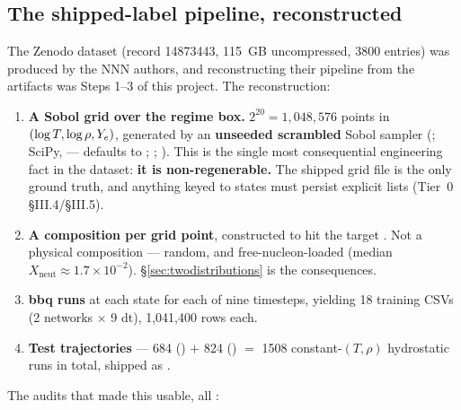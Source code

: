 \subsection{The shipped-label pipeline, reconstructed}
\label{sec:shippedpipeline}

The Zenodo dataset (record 14873443, 115~GB uncompressed, 3800 entries) was
produced by the NNN authors, and reconstructing their pipeline from the
artifacts was Steps 1--3 of this project. The reconstruction:

\begin{enumerate}
\item \textbf{A Sobol grid over the regime box.} $2^{20} = 1{,}048{,}576$
  points in $(\log T, \log\rho, Y_{e})$, generated by an \textbf{unseeded
  scrambled}  Sobol sampler (\citealt{sobol1967}; SciPy,
  \citealt{virtanen2020} ---  defaults to
  ; \citealt[\S 2.2]{grichener2025};
  ). This is the single most consequential engineering
  fact in the dataset: \textbf{it is non-regenerable.} The shipped grid file is
  the only ground truth, and anything keyed to states must persist explicit
   lists (Tier~0 \S III.4/\S III.5).
\item \textbf{A composition per grid point}, constructed to hit the target
  \Ye. Not a physical composition --- random, and free-nucleon-loaded (median
  $X_{\mathrm{neut}} \approx 1.7\times10^{-2}$). \S\ref{sec:twodistributions}
  is the consequences.
\item \textbf{bbq runs} at each state for each of nine timesteps, yielding 18
  training CSVs (2 networks $\times$ 9 dt), 1,041,400 rows each.
\item \textbf{Test trajectories} --- 684 () $+$ 824 () $=$
  1508 constant-$(T, \rho)$ hydrostatic runs in total, shipped as
  .
\end{enumerate}

The audits that made this usable, all :

